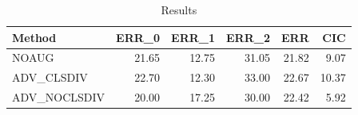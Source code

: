 \begin{table}
\caption{Results}
\label{tab:Results}
\begin{tabular}{lrrrrr}
\toprule
Method & ERR\_0 & ERR\_1 & ERR\_2 & ERR & CIC \\
\midrule
NOAUG & 21.65 & 12.75 & 31.05 & 21.82 & 9.07 \\
ADV\_CLSDIV & 22.70 & 12.30 & 33.00 & 22.67 & 10.37 \\
ADV\_NOCLSDIV & 20.00 & 17.25 & 30.00 & 22.42 & 5.92 \\
\bottomrule
\end{tabular}
\end{table}
